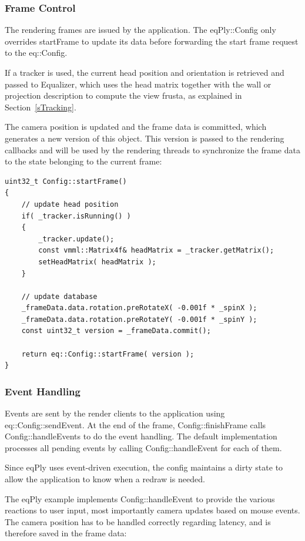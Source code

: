 \documentclass[10pt,a4]{scrartcl}
\newcommand{\sref}[1]{Section~\ref{#1}}
\begin{document}
\subsubsection{Frame Control}

The rendering frames are issued by the application. The
\textsf{eqPly::Config} only overrides \textsf{startFrame} to
update its data before forwarding the start frame request to the
\textsf{eq::Config}.

If a tracker is used, the current head position and orientation is
retrieved and passed to Equalizer, which uses the head matrix together
with the wall or projection description to compute the view
frusta, as explained in \sref{sTracking}.

The camera position is updated and the frame data is committed, which
generates a new version of this object. This version is passed to the
rendering callbacks and will be used by the rendering threads to
synchronize the frame data to the state belonging to the current frame:

{\footnotesize\begin{lstlisting}
uint32_t Config::startFrame()
{
    // update head position
    if( _tracker.isRunning() )
    {
        _tracker.update();
        const vmml::Matrix4f& headMatrix = _tracker.getMatrix();
        setHeadMatrix( headMatrix );
    }

    // update database
    _frameData.data.rotation.preRotateX( -0.001f * _spinX );
    _frameData.data.rotation.preRotateY( -0.001f * _spinY );
    const uint32_t version = _frameData.commit();

    return eq::Config::startFrame( version );
}
\end{lstlisting}}


\subsubsection{Event Handling}

Events are sent by the render clients to the application using
\textsf{eq::Config::sendEvent}. At the end of the frame,
\textsf{Config::finishFrame} calls \textsf{Config::handleEvents} to do
the event handling. The default implementation processes all pending
events by calling \textsf{Config::handleEvent} for each of them.

Since \textsf{eqPly} uses event-driven execution, the config maintains a
dirty state to allow the application to know when a redraw is needed.

The \textsf{eqPly} example implements \textsf{Config::hand\-le\-Event}
to provide the various reactions to user input, most importantly camera
updates based on mouse events. The camera position has to be handled
correctly regarding latency, and is therefore saved in the frame data:
\end{document}
